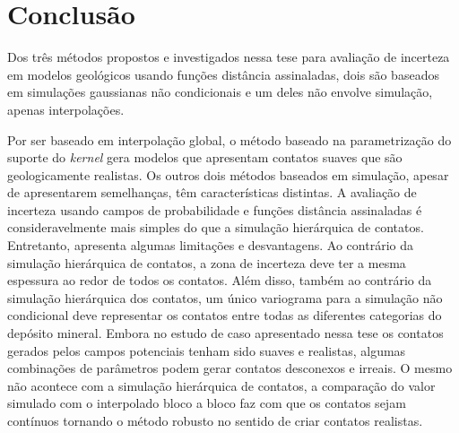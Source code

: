 \section{Conclusão}

Dos três métodos propostos e investigados nessa tese para avaliação de incerteza em modelos geológicos usando funções distância assinaladas, dois são baseados em simulações gaussianas não condicionais e um deles não envolve simulação, apenas interpolações.

Por ser baseado em interpolação global, o método baseado na parametrização do suporte do \textit{kernel} gera modelos que apresentam contatos suaves que são geologicamente realistas. Os outros dois métodos baseados em simulação, apesar de apresentarem semelhanças, têm características distintas. A avaliação de incerteza usando campos de probabilidade e funções distância assinaladas é consideravelmente mais simples do que a simulação hierárquica de contatos. Entretanto, apresenta algumas limitações e desvantagens. Ao contrário da simulação hierárquica de contatos, a zona de incerteza deve ter a mesma espessura ao redor de todos os contatos. Além disso, também ao contrário da simulação hierárquica dos contatos, um único variograma para a simulação não condicional deve representar os contatos entre todas as diferentes categorias do depósito mineral. Embora no estudo de caso apresentado nessa tese os contatos gerados pelos campos potenciais tenham sido suaves e realistas, algumas combinações de parâmetros podem gerar contatos desconexos e irreais. O mesmo não acontece com a simulação hierárquica de contatos, a comparação do valor simulado com o interpolado bloco a bloco faz com que os contatos sejam contínuos tornando o método robusto no sentido de criar contatos realistas.

